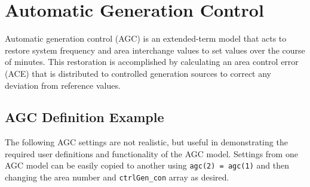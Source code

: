 \pagebreak
\section{Automatic Generation Control}  \label{sec: AGC def}
Automatic generation control (AGC) is an extended-term model that acts to restore system frequency and area interchange values to set values over the course of minutes.
This restoration is accomplished by calculating an area control error (ACE) that is distributed to controlled generation sources to correct any deviation from reference values.






\pagebreak
\subsection{AGC Definition Example}
The following AGC settings are not realistic, but useful in demonstrating the required user definitions and functionality of the AGC model.
Settings from one AGC model can be easily copied to another using \verb|agc(2) = agc(1)| and then changing the area number and \verb|ctrlGen_con| array as desired.


